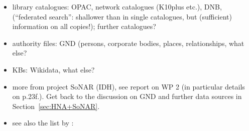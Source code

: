 \begin{itemize}
  \item
    library catalogues: OPAC, network catalogues (K10plus etc.), DNB,
     (\enquote{federated search}: shallower than in single catalogues,
    but (sufficient) information on all copies!);
    further catalogues?
  \item
    authority files: GND (persons, corporate bodies, places, relationships, what else?
  \item
    KBs: Wikidata, what else?
  \item
    more from project SoNAR (IDH), see report on WP 2 (in particular details on p.23f.).
    Get back to the discussion on GND and further data sources in Section~\ref{sec:HNA+SoNAR}.
  \item
    see also the list by \autocite{Menzel2020}:


\end{itemize}
